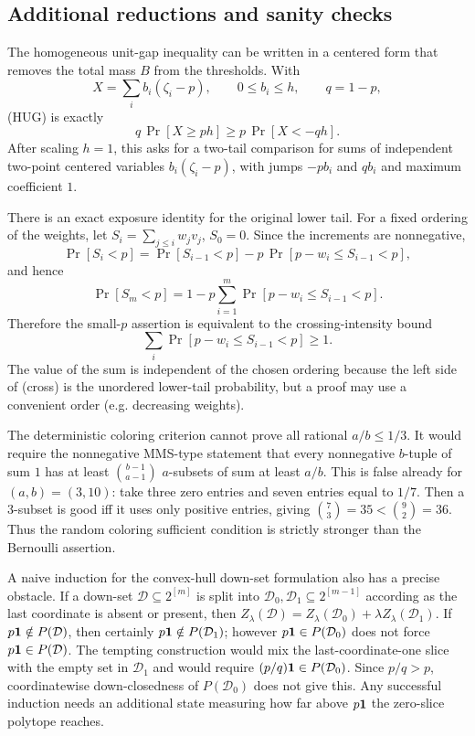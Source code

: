 \documentclass[12pt]{article}
\begin{document}
\subsection*{Additional reductions and sanity checks}

The homogeneous unit-gap inequality can be written in a centered form that
removes the total mass \(B\) from the thresholds.  With
\[
 X=\sum_i b_i(\zeta_i-p),\qquad 0\le b_i\le h,\qquad q=1-p,
\]
(HUG) is exactly
\[
        q\,\Pr[X\ge ph]\ge p\,\Pr[X<-qh].        \tag{C-HUG}
\]
After scaling \(h=1\), this asks for a two-tail comparison for sums of
independent two-point centered variables \(b_i(\zeta_i-p)\), with jumps
\(-pb_i\) and \(qb_i\) and maximum coefficient \(1\).

There is an exact exposure identity for the original lower tail.  For a fixed
ordering of the weights, let \(S_i=\sum_{j\le i}w_jv_j\), \(S_0=0\).  Since the
increments are nonnegative,
\[
 \Pr[S_i<p]=\Pr[S_{i-1}<p]
      -p\,\Pr[p-w_i\le S_{i-1}<p],
\]
and hence
\[
 \Pr[S_m<p]
 =1-p\sum_{i=1}^m\Pr[p-w_i\le S_{i-1}<p].        \tag{cross}
\]
Therefore the small-\(p\) assertion is equivalent to the crossing-intensity
bound
\[
 \sum_i\Pr[p-w_i\le S_{i-1}<p]\ge1.
\]
The value of the sum is independent of the chosen ordering because the left
side of (cross) is the unordered lower-tail probability, but a proof may use a
convenient order (e.g. decreasing weights).

The deterministic coloring criterion cannot prove all rational
\(a/b\le1/3\).  It would require the nonnegative MMS-type statement that every
nonnegative \(b\)-tuple of sum \(1\) has at least \(\binom{b-1}{a-1}\)
\(a\)-subsets of sum at least \(a/b\).  This is false already for
\((a,b)=(3,10)\): take three zero entries and seven entries equal to \(1/7\).
Then a 3-subset is good iff it uses only positive entries, giving
\(\binom73=35<\binom92=36\).  Thus the random coloring sufficient condition is
strictly stronger than the Bernoulli assertion.

A naive induction for the convex-hull down-set formulation also has a precise
obstacle.  If a down-set \(\mathcal D\subseteq2^{[m]}\) is split into
\(\mathcal D_0,\mathcal D_1\subseteq2^{[m-1]}\) according as the last coordinate
is absent or present, then \(Z_\lambda(\mathcal D)=Z_\lambda(\mathcal D_0)+
\lambda Z_\lambda(\mathcal D_1)\).  If \(p{\bf1}\notin P(\mathcal D)\), then
certainly \(p{\bf1}\notin P(\mathcal D_1)\); however \(p{\bf1}\in
P(\mathcal D_0)\) does not force \(p{\bf1}\in P(\mathcal D)\).  The tempting
construction would mix the last-coordinate-one slice with the empty set in
\(\mathcal D_1\) and would require \((p/q){\bf1}\in P(\mathcal D_0)\).  Since
\(p/q>p\), coordinatewise down-closedness of \(P(\mathcal D_0)\) does not give
this.  Any successful induction needs an additional state measuring how far
above \(p{\bf1}\) the zero-slice polytope reaches.
\end{document}
